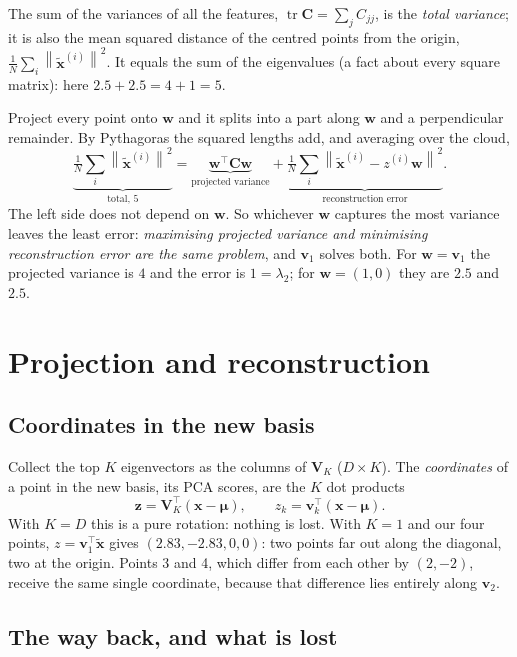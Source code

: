 \documentclass[11pt]{article}
\newcommand{\vx}{\bm{x}}
\newcommand{\vw}{\bm{w}}
\newcommand{\vv}{\bm{v}}
\newcommand{\vz}{\bm{z}}
\newcommand{\vmu}{\bm{\mu}}
\newcommand{\mC}{\bm{C}}
\newcommand{\mV}{\bm{V}}
\newcommand{\norm}[1]{\left\lVert #1 \right\rVert}
\begin{document}
The sum of the variances of all the features, $\operatorname{tr}\mC = \sum_j C_{jj}$, is
the \emph{total variance}; it is also the mean squared distance of the centred points from
the origin, $\tfrac1N\sum_i\norm{\tilde{\vx}^{(i)}}^2$. It equals the sum of the
eigenvalues (a fact about every square matrix): here $2.5 + 2.5 = 4 + 1 = 5$.

Project every point onto $\vw$ and it splits into a part along $\vw$ and a perpendicular
remainder. By Pythagoras the squared lengths add, and averaging over the cloud,
\[
\underbrace{\tfrac1N\sum_i\norm{\tilde{\vx}^{(i)}}^2}_{\text{total, } 5}
= \underbrace{\vw^{\top}\mC\vw}_{\text{projected variance}}
+ \underbrace{\tfrac1N\sum_i\norm{\tilde{\vx}^{(i)} - z^{(i)}\vw}^2}_{\text{reconstruction error}} .
\]
The left side does not depend on $\vw$. So whichever $\vw$ captures the most variance
leaves the least error: \emph{maximising projected variance and minimising reconstruction
error are the same problem}, and $\vv_1$ solves both. For $\vw = \vv_1$ the projected
variance is $4$ and the error is $1 = \lambda_2$; for $\vw = (1, 0)$ they are $2.5$ and
$2.5$.

\section{Projection and reconstruction}
\label{sec:proj}

\subsection{Coordinates in the new basis}

Collect the top $K$ eigenvectors as the columns of $\mV_K$ ($D\times K$). The
\emph{coordinates} of a point in the new basis, its PCA scores, are the $K$ dot products
\[
\vz = \mV_K^{\top}(\vx - \vmu), \qquad z_k = \vv_k^{\top}(\vx - \vmu).
\]
With $K = D$ this is a pure rotation: nothing is lost. With $K = 1$ and our four points,
$z = \vv_1^{\top}\tilde{\vx}$ gives $(2.83, -2.83, 0, 0)$: two points far out along the
diagonal, two at the origin. Points 3 and 4, which differ from each other by $(2, -2)$,
receive the same single coordinate, because that difference lies entirely along $\vv_2$.

\subsection{The way back, and what is lost}
\end{document}
